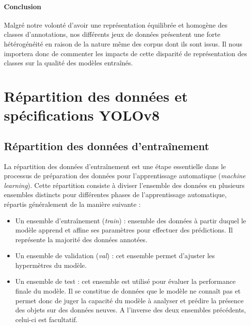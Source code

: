 \documentclass[12pt,twoside]{book}
\begin{document}
\paragraph{Conclusion} Malgré notre volonté d’avoir une représentation équilibrée et homogène des classes d’annotations, nos différents jeux de données présentent une forte hétérogénéité en raison de la nature même des corpus dont ils sont issus. Il nous importera donc de commenter les impacts de cette disparité de représentation des classes sur la qualité des modèles entraînés.

\newpage
\section{Répartition des données et spécifications YOLOv8}

\subsection{Répartition des données d'entraînement}

La répartition des données d'entraînement est une étape essentielle dans le processus de préparation des données pour l'apprentissage automatique (\textit{machine learning}). Cette répartition consiste à diviser l'ensemble des données en plusieurs ensembles distincts pour différentes phases de l'apprentissage automatique, répartis généralement de la manière suivante : \\
\begin{itemize}
    \item Un ensemble d’entraînement (\textit{train}) : ensemble des données à partir duquel le modèle apprend et affine ses paramètres pour effectuer des prédictions. Il représente la majorité des données annotées.
    \item Un ensemble de validation (\textit{val}) :  cet ensemble permet d’ajuster les hypermètres du modèle.
    \item Un ensemble de test : cet ensemble est utilisé pour évaluer la performance finale du modèle. Il se constitue de données que le modèle ne connaît pas et permet donc de juger la capacité du modèle à analyser et prédire la présence des objets sur des données neuves. A l’inverse des deux ensembles précédents, celui-ci est facultatif. 
\end{itemize}
\end{document}

